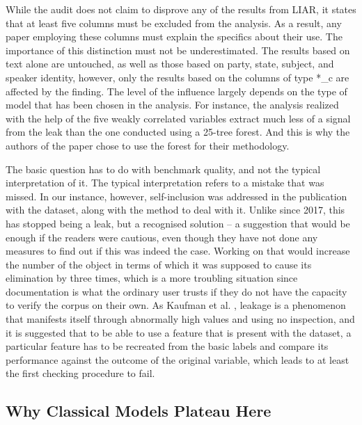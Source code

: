 \documentclass[10pt,twocolumn,twoside,a4paper]{article}
\begin{document}
While the audit does not claim to disprove any of the results from LIAR, it states that at least five columns must be excluded from the analysis. As a result, any paper employing these columns must explain the specifics about their use. The importance of this distinction must not be underestimated. The results based on text alone are untouched, as well as those based on party, state, subject, and speaker identity, however, only the results based on the columns of type *\_c are affected by the finding. The level of the influence largely depends on the type of model that has been chosen in the analysis. For instance, the analysis realized with the help of the five weakly correlated variables extract much less of a signal from the leak than the one conducted using a 25-tree forest. And this is why the authors of the paper chose to use the forest for their methodology.

The basic question has to do with benchmark quality, and not the typical interpretation of it. The typical interpretation refers to a mistake that was missed. In our instance, however, self-inclusion was addressed in the publication with the dataset, along with the method to deal with it. Unlike since 2017, this has stopped being a leak, but a recognised solution -- a suggestion that would be enough if the readers were cautious, even though they have not done any measures to find out if this was indeed the case. Working on that would increase the number of the object in terms of which it was supposed to cause its elimination by three times, which is a more troubling situation since documentation is what the ordinary user trusts if they do not have the capacity to verify the corpus on their own. As Kaufman et al. \cite{kaufman2012leakage}, leakage is a phenomenon that manifests itself through abnormally high values and using no inspection, and it is suggested that to be able to use a feature that is present with the dataset, a particular feature has to be recreated from the basic labels and compare its performance against the outcome of the original variable, which leads to at least the first checking procedure to fail.

\subsection{Why Classical Models Plateau Here}
\end{document}

